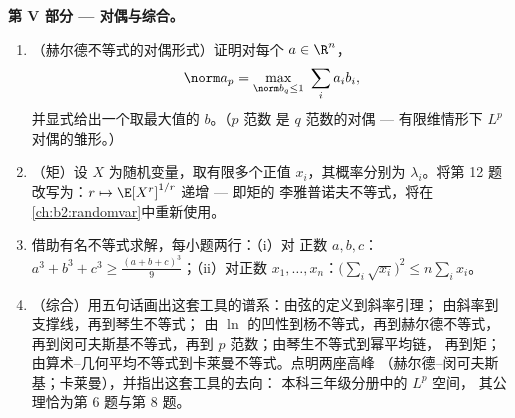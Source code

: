 \begin{problem}
\medskip
\noindent\textbf{第 V 部分 --- 对偶与综合。}
\begin{enumerate}[resume]
  \item （赫尔德不等式的对偶形式）证明对每个 $a \in
        \R^n$，
        \[
        \norm a_p = \max_{\norm b_q \leq 1}\ \sum_i a_ib_i ,
        \]
        并显式给出一个取最大值的 $b$。（$p$ 范数
        是 $q$ 范数的对偶 --- 有限维情形下
        $L^p$ 对偶的雏形。）
  \item （矩）设 $X$ 为随机变量，取有限多个正值
        $x_i$，其概率分别为
        $\lambda_i$。将第 12 题改写为：$r \mapsto
        \E[X^r]^{1/r}$ 递增 --- 即矩的
        李雅普诺夫不等式，将在
        \cref{ch:b2:randomvar}中重新使用。
  \item 借助有名不等式求解，每小题两行：（i）对
        正数 $a, b, c$：$a^3 + b^3 + c^3 \geq
        \frac{(a+b+c)^3}{9}$；（ii）对正数 $x_1, \dots,
        x_n$：$\bigl(\sum_i\sqrt{x_i}\bigr)^2 \leq
        n\sum_i x_i$。
  \item （综合）用五句话画出这套工具的谱系：由弦的定义到斜率引理；
        由斜率到支撑线，再到琴生不等式；
        由 $\ln$ 的凹性到杨不等式，再到赫尔德不等式，
        再到闵可夫斯基不等式，再到 $p$ 范数；由琴生不等式到幂平均链，
        再到矩；由算术--几何平均不等式到卡莱曼不等式。点明两座高峰
        （赫尔德--闵可夫斯基；卡莱曼），并指出这套工具的去向：
        本科三年级分册中的 $L^p$ 空间，
        其公理恰为第 6 题与第 8 题。
\end{enumerate}
\end{problem}
